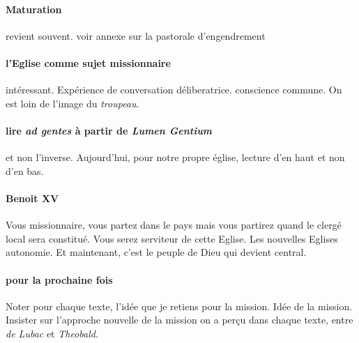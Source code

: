 \paragraph{Maturation} revient souvent.
voir annexe sur la pastorale d'engendrement

\paragraph{l'Eglise comme sujet missionnaire} intéressant. Expérience de conversation déliberatrice. conscience commune. On est loin de l'image du \textit{troupeau}. 

\paragraph{lire \textit{ad gentes} à partir de \textit{Lumen Gentium}} et non l'inverse. Aujourd'hui, pour notre propre église, lecture d'en haut et non d'en bas. 

\paragraph{Benoit XV} Vous missionnaire, vous partez dans le pays mais vous partirez quand le clergé local sera constitué. Vous serez serviteur de cette Eglise. Les nouvelles Eglises  autonomie. Et maintenant, c'est le peuple de Dieu qui devient central. 

\paragraph{pour la prochaine fois}
Noter pour chaque texte, l'idée que je retiens pour la mission. Idée de la mission. Insister sur l'approche nouvelle de la mission on a perçu dans chaque texte, entre \textit{de Lubac} et \textit{Theobald}.

